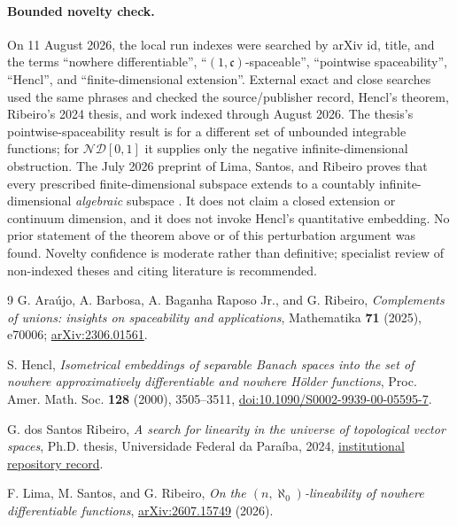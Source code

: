 \documentclass[11pt]{article}
\newcommand{\ND}{\mathcal{ND}[0,1]}
\newcommand{\cC}{\mathfrak c}
\begin{document}
\paragraph{Bounded novelty check.}
On 11 August 2026, the local run indexes were searched by arXiv id, title,
and the terms ``nowhere differentiable'', ``$(1,\cC)$-spaceable'',
``pointwise spaceability'', ``Hencl'', and ``finite-dimensional extension''.
External exact and close searches used the same phrases and checked the
source/publisher record, Hencl's theorem, Ribeiro's 2024 thesis, and work
indexed through August 2026.  The thesis's pointwise-spaceability result is
for a different set of unbounded integrable functions; for $\ND$ it supplies
only the negative infinite-dimensional obstruction.  The July 2026 preprint
of Lima, Santos, and Ribeiro proves that every prescribed finite-dimensional
subspace extends to a countably infinite-dimensional \emph{algebraic}
subspace \cite{LSR2026}.  It does not claim a closed extension or continuum
dimension, and it does not invoke Hencl's quantitative embedding.  No prior
statement of the theorem above or of this perturbation argument was found.
Novelty confidence is moderate rather than definitive; specialist review of
non-indexed theses and citing literature is recommended.

\begin{thebibliography}{9}
G. Ara\'ujo, A. Barbosa, A. Baganha Raposo Jr., and G. Ribeiro,
\emph{Complements of unions: insights on spaceability and applications},
Mathematika \textbf{71} (2025), e70006;
\href{https://arxiv.org/abs/2306.01561}{arXiv:2306.01561}.

S. Hencl,
\emph{Isometrical embeddings of separable Banach spaces into the set of
nowhere approximatively differentiable and nowhere H\"older functions},
Proc. Amer. Math. Soc. \textbf{128} (2000), 3505--3511,
\href{https://doi.org/10.1090/S0002-9939-00-05595-7}
{doi:10.1090/S0002-9939-00-05595-7}.

G. dos Santos Ribeiro,
\emph{A search for linearity in the universe of topological vector spaces},
Ph.D. thesis, Universidade Federal da Para\'iba, 2024,
\href{https://repositorio.ufpb.br/jspui/handle/123456789/38081}
{institutional repository record}.

F. Lima, M. Santos, and G. Ribeiro,
\emph{On the $(n,\aleph_0)$-lineability of nowhere differentiable functions},
\href{https://arxiv.org/abs/2607.15749}{arXiv:2607.15749} (2026).
\end{thebibliography}
\end{document}
